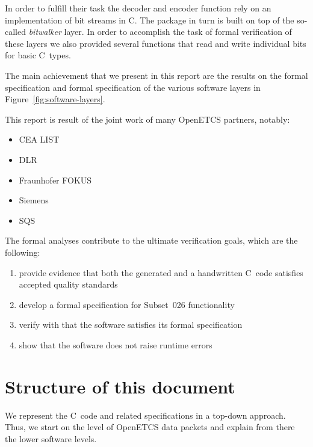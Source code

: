 \FloatBarrier

In order to fulfill their task the decoder and encoder function rely on an
implementation of bit streams in C.
The  package in turn is built on top of the so-called \emph{bitwalker} layer.
In order to accomplish the task of formal verification of these layers 
we also provided several functions that read and write individual bits for basic C~types.

The main achievement that we present in this report are the results
on the formal specification and formal specification of the various software layers 
in Figure~\ref{fig:software-layers}.

This report is result of the joint work of many OpenETCS partners, notably:

\begin{itemize}
\item CEA LIST
\item DLR
\item Fraunhofer FOKUS
\item Siemens
\item SQS
\end{itemize}

The formal analyses contribute to the ultimate verification goals,
which are the following:

\begin{enumerate}
\item provide evidence that both the generated and a handwritten C~code satisfies 
      accepted quality standards
\item develop a formal specification for Subset~026 functionality
\item verify with \framacwp that the software satisfies its formal specification
\item show that the software does not raise runtime errors
\end{enumerate}

\section{Structure of this document}

We represent the C~code and related specifications in a top-down approach.
Thus, we start on the level of OpenETCS data packets and explain from there
the lower software levels.

